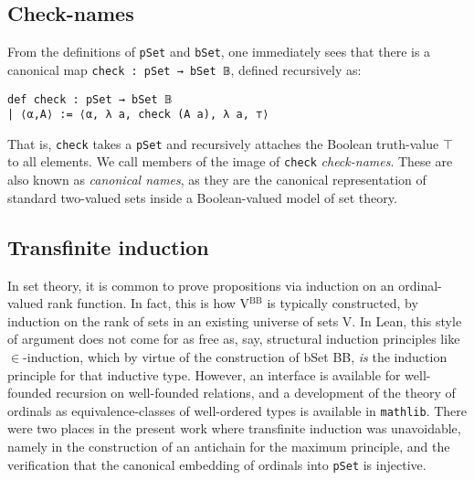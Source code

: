 \documentclass[a4paper,USenglish,cleveref, autoref]{lipics-v2019}
\newcommand{\lil}{\lstinline}
\begin{document}
\subsection{Check-names}


From the definitions of \lil{pSet} and \lil{bSet}, one immediately sees that there is a canonical map \lil{check : pSet → bSet 𝔹}, defined recursively as:
\begin{lstlisting}
def check : pSet → bSet 𝔹
| ⟨α,A⟩ := ⟨α, λ a, check (A a), λ a, ⊤⟩
\end{lstlisting}

That is, \lil{check} takes a \lil{pSet} and recursively attaches the Boolean truth-value $\top$ to all elements. We call members of the image of \lil{check} \emph{check-names}. These are also known as \emph{canonical names}, as they are the canonical representation of standard two-valued sets inside a Boolean-valued model of set theory.

\subsection{Transfinite induction}
\label{sec:org9e70de8}
In set theory, it is common to prove propositions via induction on an ordinal-valued rank function. In fact, this is how V\(^{\text{BB}}\) is typically constructed, by induction on the rank of sets in an existing universe of sets V. In Lean, this style of argument does not come for as free as, say, structural induction principles like $\in$-induction, which by virtue of the construction of bSet BB, \emph{is} the induction principle for that inductive type. However, an interface is available for well-founded recursion on well-founded relations, and a development of the theory of ordinals as equivalence-classes of well-ordered types is available in \texttt{mathlib}. There were two places in the present work where transfinite induction was unavoidable, namely in the construction of an antichain for the maximum principle, and the verification that the canonical embedding of ordinals into \texttt{pSet} is injective.
\end{document}
